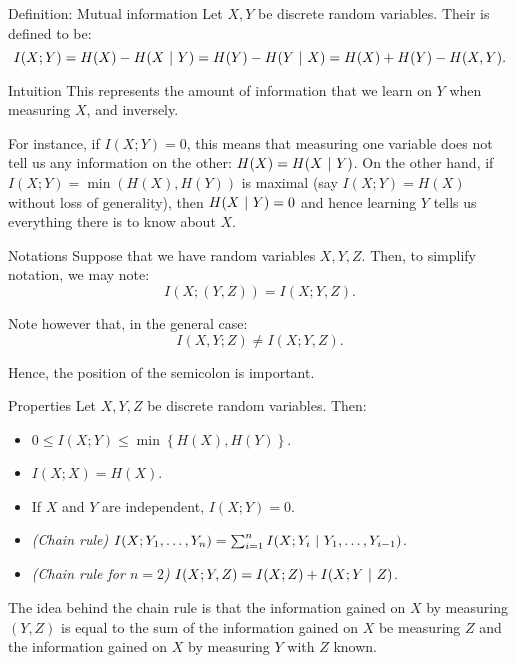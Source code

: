 \documentclass[a4paper]{article}
\begin{document}
\begin{parag}{Definition: Mutual information}
    Let $X, Y$ be discrete random variables. Their  is defined to be: 
    \[I\left(X; Y\right) = H\left(X\right) - H\left(X \suchthat Y\right) = H\left(Y\right) - H\left(Y \suchthat X\right) = H\left(X\right) + H\left(Y\right) - H\left(X, Y\right).\]

    \begin{subparag}{Intuition}
        This represents the amount of information that we learn on $Y$ when measuring $X$, and inversely. 

        For instance, if $I\left(X; Y\right) = 0$, this means that measuring one variable does not tell us any information on the other: $H\left(X\right) = H\left(X \suchthat Y\right)$. On the other hand, if $I\left(X; Y\right) = \min\left(H\left(X\right), H\left(Y\right)\right)$ is maximal (say $I\left(X; Y\right) = H\left(X\right)$ without loss of generality), then $H\left(X \suchthat Y\right) = 0$ and hence learning $Y$ tells us everything there is to know about $X$.
    \end{subparag}

    \begin{subparag}{Notations}
        Suppose that we have random variables $X, Y, Z$. Then, to simplify notation, we may note: 
        \[I\left(X; \left(Y,  Z\right)\right) = I\left(X; Y, Z\right).\]

        Note however that, in the general case: 
        \[I\left(X, Y; Z\right) \neq I\left(X; Y, Z\right).\]
        
        Hence, the position of the semicolon is important.
    \end{subparag}

    \begin{subparag}{Properties}
        Let $X, Y, Z$ be discrete random variables. Then:
        \begin{itemize}
            \item $0 \leq I\left(X; Y\right) \leq \min\left\{H\left(X\right), H\left(Y\right)\right\}$.
            \item $I\left(X; X\right) = H\left(X\right)$.
            \item If $X$ and $Y$ are independent, $I\left(X; Y\right) = 0$.
            \item \textit{(Chain rule)} $I\left(X; Y_1, \ldots, Y_n\right) = \sum_{i=1}^{n} I\left(X; Y_i \suchthat Y_1, \ldots, Y_{i-1}\right)$.
            \item \textit{(Chain rule for $n=2$)} $I\left(X; Y, Z\right) = I\left(X; Z\right) + I\left(X; Y \suchthat Z\right)$.
        \end{itemize}

        The idea behind the chain rule is that the information gained on $X$ by measuring $\left(Y, Z\right)$ is equal to the sum of the information gained on $X$ be measuring $Z$ and the information gained on $X$ by measuring $Y$ with $Z$ known.
    \end{subparag}
\end{parag}
\end{document}
